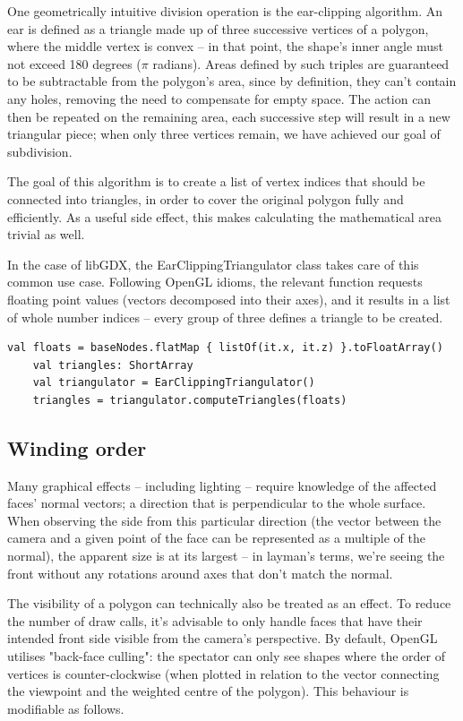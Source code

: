One geometrically intuitive division operation is the ear-clipping algorithm. An ear is defined as a triangle made up of three successive vertices of a polygon, where the middle vertex is convex -- in that point, the shape's inner angle must not exceed 180 degrees ($\pi$ radians).\cite{TriangulationByEarClipping} Areas defined by such triples are guaranteed to be subtractable from the polygon's area, since by definition, they can't contain any holes, removing the need to compensate for empty space. The action can then be repeated on the remaining area, each successive step will result in a new triangular piece; when only three vertices remain, we have achieved our goal of subdivision.

The goal of this algorithm is to create a list of vertex indices that should be connected into triangles, in order to cover the original polygon fully and efficiently. As a useful side effect, this makes calculating the mathematical area trivial as well.

In the case of libGDX, the EarClippingTriangulator class takes care of this common use case. Following OpenGL idioms, the relevant function requests floating point values (vectors decomposed into their axes), and it results in a list of whole number indices -- every group of three defines a triangle to be created.

\begin{lstlisting}[caption=Example usage of the EarClippingTriangulator class]
    val floats = baseNodes.flatMap { listOf(it.x, it.z) }.toFloatArray()
    val triangles: ShortArray
    val triangulator = EarClippingTriangulator()
    triangles = triangulator.computeTriangles(floats)
\end{lstlisting}

\subsection{Winding order}

Many graphical effects -- including lighting -- require knowledge of the affected faces' normal vectors; a direction that is perpendicular to the whole surface.
When observing the side from this particular direction (the vector between the camera and a given point of the face can be represented as a multiple of the normal), the apparent size is at its largest -- in layman's terms, we're seeing the front without any rotations around axes that don't match the normal.

The visibility of a polygon can technically also be treated as an effect. To reduce the number of draw calls, it's advisable to only handle faces that have their intended front side visible from the camera's perspective. By default, OpenGL utilises "back-face culling": the spectator can only see shapes where the order of vertices is counter-clockwise (when plotted in relation to the vector connecting the viewpoint and the weighted centre of the polygon). This behaviour is modifiable as follows.

